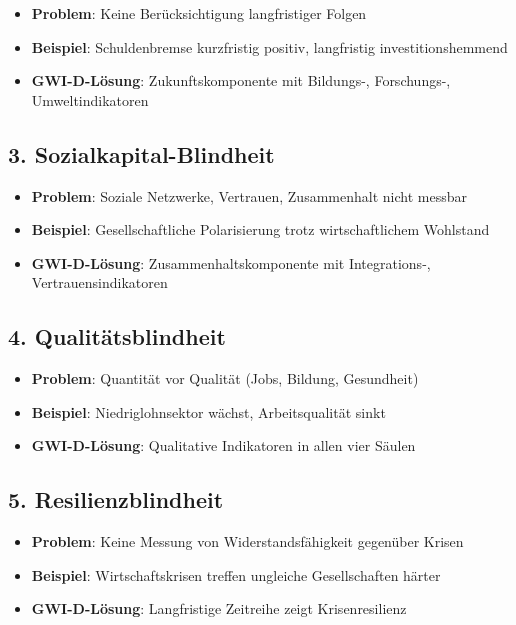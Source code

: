 \begin{itemize}
    \item \textbf{Problem}: Keine Berücksichtigung langfristiger Folgen
    \item \textbf{Beispiel}: Schuldenbremse kurzfristig positiv, langfristig investitionshemmend
    \item \textbf{GWI-D-Lösung}: Zukunftskomponente mit Bildungs-, Forschungs-, Umweltindikatoren
\end{itemize}

\subsection{3. Sozialkapital-Blindheit}

\begin{itemize}
    \item \textbf{Problem}: Soziale Netzwerke, Vertrauen, Zusammenhalt nicht messbar
    \item \textbf{Beispiel}: Gesellschaftliche Polarisierung trotz wirtschaftlichem Wohlstand
    \item \textbf{GWI-D-Lösung}: Zusammenhaltskomponente mit Integrations-, Vertrauensindikatoren
\end{itemize}

\subsection{4. Qualitätsblindheit}

\begin{itemize}
    \item \textbf{Problem}: Quantität vor Qualität (Jobs, Bildung, Gesundheit)
    \item \textbf{Beispiel}: Niedriglohnsektor wächst, Arbeitsqualität sinkt
    \item \textbf{GWI-D-Lösung}: Qualitative Indikatoren in allen vier Säulen
\end{itemize}

\subsection{5. Resilienzblindheit}

\begin{itemize}
    \item \textbf{Problem}: Keine Messung von Widerstandsfähigkeit gegenüber Krisen
    \item \textbf{Beispiel}: Wirtschaftskrisen treffen ungleiche Gesellschaften härter
    \item \textbf{GWI-D-Lösung}: Langfristige Zeitreihe zeigt Krisenresilienz
\end{itemize}

